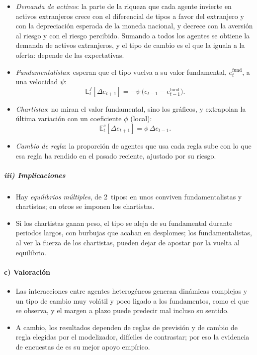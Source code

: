 \documentclass[11pt]{article}
\begin{document}
\begin{itemize}
\item \emph{Demanda de activos}: la parte de la riqueza que cada agente invierte en activos extranjeros crece con el diferencial de tipos a favor del extranjero y con la depreciación esperada de la moneda nacional, y decrece con la aversión al riesgo y con el riesgo percibido. Sumando a todos los agentes se obtiene la demanda de activos extranjeros, y el tipo de cambio es el que la iguala a la oferta: depende de las expectativas.
\item \emph{Fundamentalistas}: esperan que el tipo vuelva a su valor fundamental, $e^{\mathrm{fund}}_t$, a una velocidad $\psi$:
  \begin{equation}\label{eq:dgg-fundamentalistas}
  \mathbb{E}^{f}_t[\Delta e_{t+1}]=-\psi\,\big(e_{t-1}-e^{\mathrm{fund}}_{t-1}\big).
  \end{equation}
\item \emph{Chartistas}: no miran el valor fundamental, sino los gráficos, y extrapolan la última variación con un coeficiente $\phi$ (local):
  \begin{equation}\label{eq:dgg-chartistas}
  \mathbb{E}^{c}_t[\Delta e_{t+1}]=\phi\,\Delta e_{t-1}.
  \end{equation}
\item \emph{Cambio de regla}: la proporción de agentes que usa cada regla sube con lo que esa regla ha rendido en el pasado reciente, ajustado por su riesgo.
\end{itemize}

\subparagraph{iii) Implicaciones}

\begin{itemize}
\item Hay \emph{equilibrios múltiples}, de 2~tipos: en unos conviven fundamentalistas y chartistas; en otros se imponen los chartistas.
\item Si los chartistas ganan peso, el tipo se aleja de su fundamental durante periodos largos, con burbujas que acaban en desplomes; los fundamentalistas, al ver la fuerza de los chartistas, pueden dejar de apostar por la vuelta al equilibrio.
\end{itemize}

\paragraph{c) Valoración}

\begin{itemize}
\item Las interacciones entre agentes heterogéneos generan dinámicas complejas y un tipo de cambio muy volátil y poco ligado a los fundamentos, como el que se observa, y el margen a plazo puede predecir mal incluso su sentido.
\item A cambio, los resultados dependen de reglas de previsión y de cambio de regla elegidas por el modelizador, difíciles de contrastar; por eso la evidencia de encuestas de \textcite{FrankelFroot1987Survey} es su mejor apoyo empírico.
\end{itemize}
\end{document}
